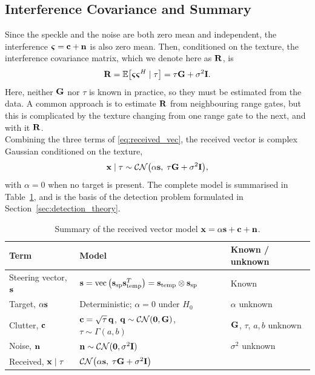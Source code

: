 \documentclass[12pt, a4paper]{report}
\begin{document}
\subsection{Interference Covariance and Summary}
\label{sec:covariance}
Since the speckle and the noise are both zero mean and independent, the interference $\boldsymbol{\varsigma}=\vb c+\vb n$ is also zero mean. Then, conditioned on the texture, the interference covariance matrix, which we denote here as $\mathbf{R}$, is
\begin{equation}
    \mathbf{R} = \mathbb{E}\!\left[\boldsymbol{\varsigma}\boldsymbol{\varsigma}^H \mid \tau\right] = \tau\mathbf{G} + \sigma^2\mathbf{I}.
    \label{eq:R}
\end{equation}
Here, neither $\mathbf{G}$ nor $\tau$ is known in practice, so they must be estimated from the data. A common approach is to estimate $\mathbf{R}$ from neighbouring range gates, but this is complicated by the texture changing from one range gate to the next, and with it $\mathbf{R}$.\\

Combining the three terms of \eqref{eq:received_vec}, the received vector is complex Gaussian conditioned on the texture,
\begin{equation}
    \vb x\mid\tau \sim \mathcal{CN}\big(\alpha\vb s,\; \tau\mathbf{G} + \sigma^2\mathbf{I}\big),
    \label{eq:x_given_tau}
\end{equation}
with $\alpha=0$ when no target is present. The complete model is summarised in Table~\ref{tab:signal_model}, and is the basis of the detection problem formulated in Section~\ref{sec:detection_theory}.

\vspace{40pt}
\begin{table}[h]
    \centering
    \caption{Summary of the received vector model $\vb x = \alpha\vb s + \vb c + \vb n$.}
    \label{tab:signal_model}
    \renewcommand{\arraystretch}{1.6}
    \begin{tabular}{@{}l l l@{}}
        \hline
        Term & Model & Known / unknown \\
        \hline
        Steering vector, $\vb s$ & $\vb s=\operatorname{vec}\big(\vb s_\mathrm{sp}\vb s_\mathrm{temp}^T\big)=\vb s_\mathrm{temp}\otimes\vb s_\mathrm{sp}$ & Known \\
        Target, $\alpha\vb s$ & Deterministic; $\alpha=0$ under $H_0$ & $\alpha$ unknown \\
        Clutter, $\vb c$ & $\vb c=\sqrt{\tau}\,\vb q$, \quad $\vb q\sim\mathcal{CN}(\vb 0,\mathbf{G})$, \quad $\tau\sim\Gamma(a,b)$ & $\mathbf{G}$, $\tau$, $a, b$ unknown \\
        Noise, $\vb n$ & $\vb n\sim\mathcal{CN}(\vb 0,\sigma^2\mathbf{I})$ & $\sigma^2$ unknown \\
        \hline
        Received, $\vb x\mid\tau$ & $\mathcal{CN}\big(\alpha\vb s,\; \tau\mathbf{G}+\sigma^2\mathbf{I}\big)$ & \\
        \hline
    \end{tabular}
\end{table}
\end{document}

